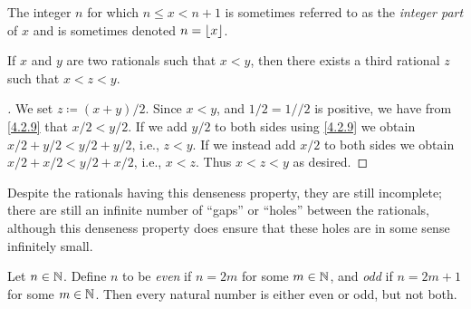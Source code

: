 \begin{rmk}\label{4.4.2}
  The integer \(n\) for which \(n \leq x < n + 1\) is sometimes referred to as the \emph{integer part} of \(x\) and is sometimes denoted \(n = \left\lfloor x\right\rfloor\).
\end{rmk}

\begin{prop}\label{4.4.3}
  If \(x\) and \(y\) are two rationals such that \(x < y\), then there exists a third rational \(z\) such that \(x < z < y\).
\end{prop}

\begin{proof}[]
  We set \(z \coloneqq (x + y) / 2\).
  Since \(x < y\), and \(1 / 2 = 1 // 2\) is positive, we have from \cref{4.2.9} that \(x / 2 < y / 2\).
  If we add \(y / 2\) to both sides using \cref{4.2.9} we obtain \(x / 2 + y / 2 < y / 2 + y / 2\), i.e., \(z < y\).
  If we instead add \(x / 2\) to both sides we obtain \(x / 2 + x / 2 < y / 2 + x / 2\), i.e., \(x < z\).
  Thus \(x < z < y\) as desired.
\end{proof}

\begin{note}
  Despite the rationals having this denseness property, they are still incomplete;
  there are still an infinite number of ``gaps'' or ``holes'' between the rationals, although this denseness property does ensure that these holes are in some sense infinitely small.
\end{note}

\begin{ac}\label{ac:4.4.2}
  Let \(n \in \mathbb{N}\).
  Define \(n\) to be \emph{even} if \(n = 2m\) for some \(m \in \mathbb{N}\), and \emph{odd} if \(n = 2m + 1\) for some \(m \in \mathbb{N}\).
  Then every natural number is either even or odd, but not both.
\end{ac}

